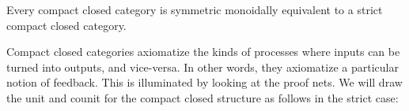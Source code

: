 \begin{theorem}
Every compact closed category is  symmetric monoidally equivalent to a strict compact closed category. 
\end{theorem}



Compact closed categories axiomatize the kinds of processes where inputs can be turned into outputs, and vice-versa.  In other words, they axiomatize a particular notion of feedback.  This is illuminated by looking at the proof nets.
We will draw the unit and counit for the compact closed structure as follows in the strict case:
%
%
